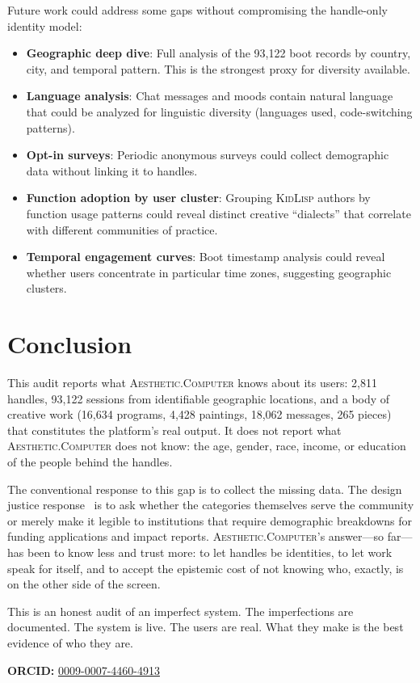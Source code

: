 \documentclass[10pt,letterpaper,twocolumn]{article}
\newcommand{\ac}{\textsc{Aesthetic.Computer}}
\newcommand{\kl}{\textsc{KidLisp}}
\begin{document}
Future work could address some gaps without compromising the handle-only identity model:

\begin{itemize}
  \item \textbf{Geographic deep dive}: Full analysis of the 93,122 boot records by country, city, and temporal pattern. This is the strongest proxy for diversity available.
  \item \textbf{Language analysis}: Chat messages and moods contain natural language that could be analyzed for linguistic diversity (languages used, code-switching patterns).
  \item \textbf{Opt-in surveys}: Periodic anonymous surveys could collect demographic data without linking it to handles.
  \item \textbf{Function adoption by user cluster}: Grouping \kl{} authors by function usage patterns could reveal distinct creative ``dialects'' that correlate with different communities of practice.
  \item \textbf{Temporal engagement curves}: Boot timestamp analysis could reveal whether users concentrate in particular time zones, suggesting geographic clusters.
\end{itemize}

\section{Conclusion}

This audit reports what \ac{} knows about its users: 2,811 handles, 93,122 sessions from identifiable geographic locations, and a body of creative work (16,634 programs, 4,428 paintings, 18,062 messages, 265 pieces) that constitutes the platform's real output. It does not report what \ac{} does not know: the age, gender, race, income, or education of the people behind the handles.

The conventional response to this gap is to collect the missing data. The design justice response~\citep{costanzachock2020design} is to ask whether the categories themselves serve the community or merely make it legible to institutions that require demographic breakdowns for funding applications and impact reports. \ac{}'s answer---so far---has been to know less and trust more: to let handles be identities, to let work speak for itself, and to accept the epistemic cost of not knowing who, exactly, is on the other side of the screen.

This is an honest audit of an imperfect system. The imperfections are documented. The system is live. The users are real. What they make is the best evidence of who they are.

\vspace{0.5em}
\noindent\textbf{ORCID:} \href{https://orcid.org/0009-0007-4460-4913}{0009-0007-4460-4913}



\end{document}
